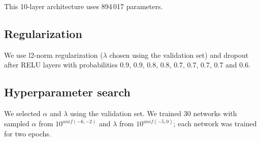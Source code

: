 	 This 10-layer architecture uses 894\,017 parameters.
	
\subsection{Regularization}
We use l2-norm regularization ($\lambda$ chosen using the validation set) and dropout after RELU layers with probabilities 0.9, 0.9, 0.8, 0.8, 0.7, 0.7, 0.7, 0.7 and 0.6.

\subsection{Hyperparameter search}
We selected $\alpha$ and $\lambda$ using the validation set. We trained 30 networks with sampled $\alpha$ from $10^{unif(-6, -2)}$ and $\lambda$ from $10^{unif(-5, 0)}$; each network was trained for two epochs.

